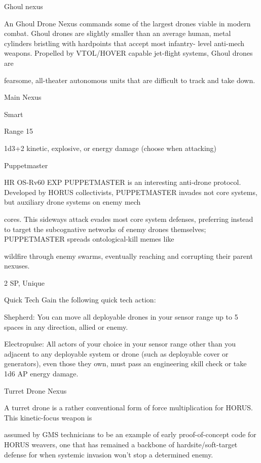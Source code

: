 Ghoul nexus  

An Ghoul Drone Nexus commands some of the largest drones viable in modern combat. Ghoul drones are  
slightly smaller than an average human, metal cylinders bristling with hardpoints that accept most infantry- 
level anti-mech weapons. Propelled by VTOL/HOVER capable jet-flight systems, Ghoul drones are  

fearsome, all-theater autonomous units that are difficult to track and take down.   

Main Nexus
 
Smart
 
Range 15
 
1d3+2 kinetic, explosive, or energy damage (choose when attacking)
 

                                                                                                                       


Puppetmaster  

HR OS-Rv60 EXP PUPPETMASTER is an interesting anti-drone protocol. Developed by HORUS  
collectivists, PUPPETMASTER invades not core systems, but auxiliary drone systems on enemy mech  

cores. This sideways attack evades most core system defenses, preferring instead to target the  
subcognative networks of enemy drones themselves; PUPPETMASTER spreads ontological-kill memes like  

wildfire through enemy swarms, eventually reaching and corrupting their parent nexuses.   

2 SP, Unique  

Quick Tech  
Gain the following quick tech action:
 
         Shepherd: You can move all deployable drones in your sensor range up to 5 spaces in  
         any direction, allied or enemy.
 
         Electropulse: All actors of your choice in your sensor range other than you adjacent to  
         any deployable system or drone (such as deployable cover or generators), even those  
         they own, must pass an engineering skill check or take 1d6 AP energy damage.  

Turret Drone Nexus  

A turret drone is a rather conventional form of force multiplication for HORUS. This kinetic-focus weapon is  

assumed by GMS technicians to be an example of early proof-of-concept code for HORUS weavers, one  
that has remained a backbone of hardsite/soft-target defense for when systemic invasion won’t stop a  
determined enemy.   

